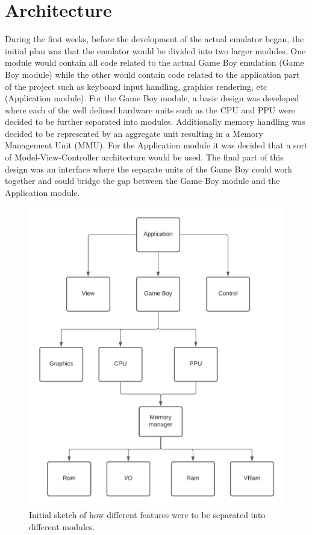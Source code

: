\newpage
\section{Architecture}
During the first weeks, before the development of the actual emulator began, the initial plan was that the emulator would be divided into two larger modules. One module would contain all code related to the actual Game Boy emulation (Game Boy module) while the other would contain code related to the application part of the project such as keyboard input handling, graphics rendering, etc (Application module). For the Game Boy module, a basic design was developed where each of the well defined hardware units such as the CPU and PPU were decided to be further separated into modules. Additionally memory handling was decided to be represented by an aggregate unit resulting in a Memory Management Unit (MMU). For the Application module it was decided that a sort of Model-View-Controller architecture would be used. The final part of this design was an interface where the separate units of the Game Boy could work together and could bridge the gap between the Game Boy module and the Application module.
\begin{figure}[H]
    \centering
    \includegraphics[scale=0.7]{figures/Gameboy Domain model.png}
    \caption{Initial sketch of how different features were to be separated into different modules.}
    \label{fig:initial_domain_model}
\end{figure}

